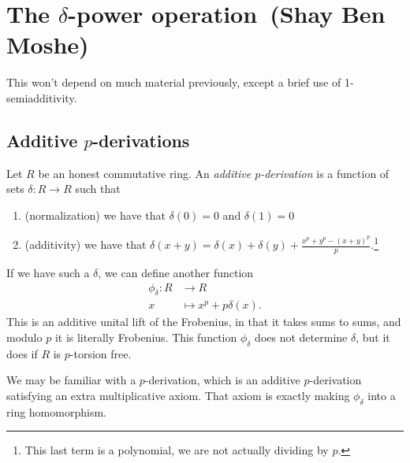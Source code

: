 \renewcommand{\thespeaker}{Shay Ben Moshe}
\renewcommand{\thetitle}{The $\delta$-power operation}
\section{\thetitle~(\thespeaker)}

This won't depend on much material previously, except a brief use of 1-semiadditivity.

\subsection{Additive $p$-derivations}

\begin{definition} Let $R$ be an honest commutative ring. An \textit{additive $p$-derivation} is a function of sets $\delta: R \to R$ such that
\begin{enumerate}
    \item (normalization) we have that $\delta(0) = 0$ and $\delta(1) = 0$
    \item (additivity) we have that $\delta(x+y) = \delta(x) + \delta(y) + \frac{x^p + y^p - (x+y)^p}{p}$.\footnote{This last term is a polynomial, we are not actually dividing by $p$.}
\end{enumerate}
\end{definition}

\begin{remark} If we have such a $\delta$, we can define another function
\begin{align*}
    \phi_\delta : R &\to R \\
    x &\mapsto x^p + p \delta(x).
\end{align*}
This is an additive unital lift of the Frobenius, in that it takes sums to sums, and modulo $p$ it is literally Frobenius. This function $\phi_\delta$ does not determine $\delta$, but it does if $R$ is $p$-torsion free.
\end{remark}

We may be familiar with a $p$-derivation, which is an additive $p$-derivation satisfying an extra multiplicative axiom. That axiom is exactly making $\phi_\delta$ into a ring homomorphism.

